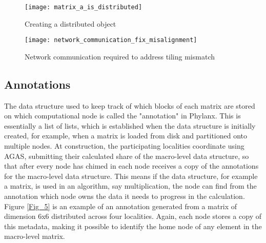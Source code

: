 \begin{figure}
	\centering
	\texttt{[image: matrix\_a\_is\_distributed]}
	\caption{Creating a distributed object}
	\label{Fig_3}
\end{figure}

\begin{figure}
	\centering
	\texttt{[image: network\_communication\_fix\_misalignment]}
	\caption{Network communication required to address tiling mismatch}
	\label{Fig_4}
\end{figure}


\subsection{Annotations}
The data structure used to keep track of which blocks of each matrix are stored on which computational node is called the "annotation" in Phylanx. This is essentially a list of lists, which is established when the data structure is initially created, for example, when a matrix is loaded from disk and partitioned onto multiple nodes. At construction, the participating localities coordinate using AGAS, submitting their calculated share of the macro-level data structure, so that after every node has chimed in each node receives a copy of the annotations for the macro-level data structure. This means if the data structure, for example a matrix, is used in an algorithm, say multiplication, the node can find from the annotation which node owns the data it needs to progress in the calculation. Figure \ref{Fig_5} is an example of an annotation generated from a matrix of dimension 6x6 distributed across four localities. Again, each node stores a copy of this metadata, making it possible to identify the home node of any element in the macro-level matrix. 
